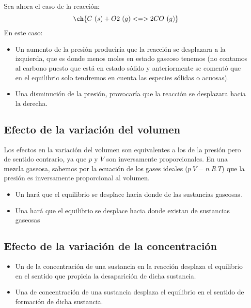     \begin{example}
        Sea ahora el caso de la reacción:
        \begin{equation*}
            \ch{C\ (s) + O2 \ (g) <=> 2 CO\ (g)}
        \end{equation*}
        En este caso:
        \begin{itemize}
            \item Un aumento de la presión produciría que la reacción se desplazara a la izquierda, que es donde menos moles en estado gaseoso tenemos (no contamos al carbono puesto que está en estado sólido y anteriormente se comentó que en el equilibrio solo tendremos en cuenta las especies sólidas o acuosas).
            \item Una disminución de la presión, provocaría que la reacción se desplazara hacia la derecha.
        \end{itemize}
    \end{example}

    \subsection{Efecto de la variación del volumen}\label{subsec:efecto-de-la-variacion-del-volumen}

    Los efectos en la variación del volumen son equivalentes a los de la presión pero de sentido contrario, ya que \(p\) y \(V\) son inversamente proporcionales.
    En una mezcla gaseosa, sabemos por la ecuación de los gases ideales ($p\ V = n\ R\ T$) que la presión es inversamente proporcional al volumen.

    \begin{itemize}
        \item Un  hará que el equilibrio se desplace hacia donde  de las sustancias gaseosas.
        \item Una  hará que el equilibrio se desplace hacia donde existan  de sustancias gaseosas
    \end{itemize}

    \subsection{Efecto de la variación de la concentración}\label{subsec:efecto-de-la-variacion-de-la-concentracion}
    \begin{itemize}
        \item Un  de la concentración de una sustancia  en la reacción desplaza el equilibrio en el sentido que propicia la desaparición de dicha sustancia.
        \item Una  de concentración de una sustancia desplaza el equilibrio en el sentido de formación de dicha sustancia.
    \end{itemize}


